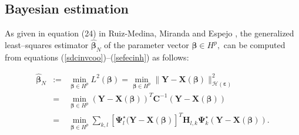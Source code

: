 \documentclass[11pt,a4paper]{article}
\begin{document}
\subsection{Bayesian estimation}

As given in equation (24) in  Ruiz-Medina,  Miranda and  Espejo \cite{RuizMedinaMirandaEspejo19},  the generalized least--squares estimator  $\widehat{\boldsymbol{\beta }}_{N}$ of the parameter vector $\boldsymbol{\beta }\in H^{p},$ can be computed from equations  (\ref{sdcinvcoo})--(\ref{sefecinh}) as follows:

\begin{eqnarray} \widehat{\boldsymbol{\beta }}_{N}&:=&\min_{\boldsymbol{\beta}\in H^{p}} L^{2}(\boldsymbol{\beta})=\min_{\boldsymbol{\beta}\in H^{p}}\|\mathbf{Y}-\mathbf{X}(\boldsymbol{\beta })\|_{\mathcal{H}(\boldsymbol{\varepsilon})}^{2}\nonumber \\
&=&\min_{\boldsymbol{\beta}\in H^{p}}(\mathbf{Y}-\mathbf{X}(\boldsymbol{\beta }))^{T}\mathbf{C}^{-1}(\mathbf{Y}-\mathbf{X}(\boldsymbol{\beta }))\nonumber \\
&=&\min_{\boldsymbol{\beta}\in H^{p}}\sum_{k,l}[\boldsymbol{\Psi}_{l}^{\star}(\mathbf{Y}-\mathbf{X}(\boldsymbol{\beta })]^{T}
\mathbf{H}_{l,k}\boldsymbol{\Psi}_{k}^{\star}(\mathbf{Y}-\mathbf{X}(\boldsymbol{\beta })).
\label{lossfunction}
\end{eqnarray}
\end{document}
